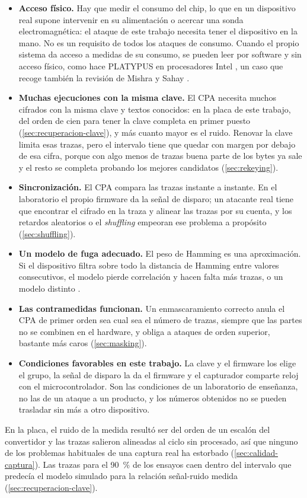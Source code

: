 \begin{itemize}
  \item \textbf{Acceso físico.} Hay que medir el consumo del chip, lo que en un
    dispositivo real supone intervenir en su alimentación o acercar una sonda
    electromagnética: el ataque de este trabajo necesita tener el dispositivo
    en la mano. No es un requisito de todos los ataques de consumo. Cuando el
    propio sistema da acceso a medidas de su consumo, se pueden leer por
    software y sin acceso físico, como hace PLATYPUS en procesadores Intel
    \cite{lipp2021platypus}, un caso que recoge también la revisión de Mishra
    y Sahay \cite[sec.~III.G]{mishra2025modern}.
  \item \textbf{Muchas ejecuciones con la misma clave.} El CPA necesita muchos
    cifrados con la misma clave y textos conocidos: en la placa de este
    trabajo, del orden de cien para tener la clave completa en primer puesto
    (\cref{sec:recuperacion-clave}), y más cuanto mayor es el ruido. Renovar
    la clave limita esas trazas, pero el intervalo tiene que quedar con margen
    por debajo de esa cifra, porque con algo menos de trazas buena parte de
    los bytes ya sale y el resto se completa probando los mejores candidatos
    (\cref{sec:rekeying}).
  \item \textbf{Sincronización.} El CPA compara las trazas instante a instante.
    En el laboratorio el propio firmware da la señal de disparo; un atacante
    real tiene que encontrar el cifrado en la traza y alinear las trazas por su
    cuenta, y los retardos aleatorios o el \emph{shuffling} empeoran ese
    problema a propósito (\cref{sec:shuffling}).
  \item \textbf{Un modelo de fuga adecuado.} El peso de Hamming es una
    aproximación. Si el dispositivo filtra sobre todo la distancia de Hamming
    entre valores consecutivos, el modelo pierde correlación y hacen falta más
    trazas, o un modelo distinto \cite{brier2004cpa}.
  \item \textbf{Las contramedidas funcionan.} Un enmascaramiento correcto anula
    el CPA de primer orden sea cual sea el número de trazas, siempre que las
    partes no se combinen en el hardware, y obliga a ataques de orden
    superior, bastante más caros (\cref{sec:masking}).
  \item \textbf{Condiciones favorables en este trabajo.} La clave y el firmware
    los elige el grupo, la señal de disparo la da el firmware y el capturador
    comparte reloj con el microcontrolador. Son las condiciones de un
    laboratorio de enseñanza, no las de un ataque a un producto, y los números
    obtenidos no se pueden trasladar sin más a otro dispositivo.
\end{itemize}
En la placa, el ruido de la medida resultó ser del orden de un escalón del
convertidor y las trazas salieron alineadas al ciclo sin procesado, así que
ninguno de los problemas habituales de una captura real ha estorbado
(\cref{sec:calidad-captura}). Las \realTracesNinety{} trazas para el 90~\% de
los ensayos caen dentro del intervalo que predecía el modelo simulado para la
relación señal-ruido medida (\cref{sec:recuperacion-clave}).

